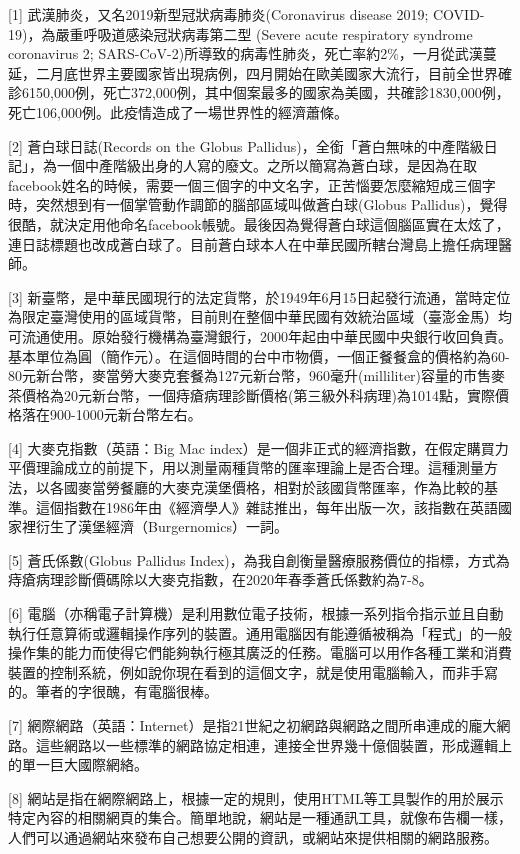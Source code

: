 \documentclass[
]{article}
\begin{document}
{[}1{]} 武漢肺炎，又名2019新型冠狀病毒肺炎(Coronavirus disease 2019;
COVID-19)，為嚴重呼吸道感染冠狀病毒第二型 (Severe acute respiratory
syndrome coronavirus 2;
SARS-CoV-2)所導致的病毒性肺炎，死亡率約2\%，一月從武漢蔓延，二月底世界主要國家皆出現病例，四月開始在歐美國家大流行，目前全世界確診6150,000例，死亡372,000例，其中個案最多的國家為美國，共確診1830,000例，死亡106,000例。此疫情造成了一場世界性的經濟蕭條。

{[}2{]} 蒼白球日誌(Records on the Globus
Pallidus)，全銜「蒼白無味的中產階級日記」，為一個中產階級出身的人寫的廢文。之所以簡寫為蒼白球，是因為在取facebook姓名的時候，需要一個三個字的中文名字，正苦惱要怎麼縮短成三個字時，突然想到有一個掌管動作調節的腦部區域叫做蒼白球(Globus
Pallidus)，覺得很酷，就決定用他命名facebook帳號。最後因為覺得蒼白球這個腦區實在太炫了，連日誌標題也改成蒼白球了。目前蒼白球本人在中華民國所轄台灣島上擔任病理醫師。

{[}3{]}
新臺幣，是中華民國現行的法定貨幣，於1949年6月15日起發行流通，當時定位為限定臺灣使用的區域貨幣，目前則在整個中華民國有效統治區域（臺澎金馬）均可流通使用。原始發行機構為臺灣銀行，2000年起由中華民國中央銀行收回負責。基本單位為圓（簡作元）。在這個時間的台中市物價，一個正餐餐盒的價格約為60-80元新台幣，麥當勞大麥克套餐為127元新台幣，960毫升(milliliter)容量的市售麥茶價格為20元新台幣，一個痔瘡病理診斷價格(第三級外科病理)為1014點，實際價格落在900-1000元新台幣左右。

{[}4{]} 大麥克指數（英語：Big Mac
index）是一個非正式的經濟指數，在假定購買力平價理論成立的前提下，用以測量兩種貨幣的匯率理論上是否合理。這種測量方法，以各國麥當勞餐廳的大麥克漢堡價格，相對於該國貨幣匯率，作為比較的基準。這個指數在1986年由《經濟學人》雜誌推出，每年出版一次，該指數在英語國家裡衍生了漢堡經濟（Burgernomics）一詞。

{[}5{]} 蒼氏係數(Globus Pallidus
Index)，為我自創衡量醫療服務價位的指標，方式為痔瘡病理診斷價碼除以大麥克指數，在2020年春季蒼氏係數約為7-8。

{[}6{]}
電腦（亦稱電子計算機）是利用數位電子技術，根據一系列指令指示並且自動執行任意算術或邏輯操作序列的裝置。通用電腦因有能遵循被稱為「程式」的一般操作集的能力而使得它們能夠執行極其廣泛的任務。電腦可以用作各種工業和消費裝置的控制系統，例如說你現在看到的這個文字，就是使用電腦輸入，而非手寫的。筆者的字很醜，有電腦很棒。

{[}7{]}
網際網路（英語：Internet）是指21世紀之初網路與網路之間所串連成的龐大網路。這些網路以一些標準的網路協定相連，連接全世界幾十億個裝置，形成邏輯上的單一巨大國際網絡。

{[}8{]}
網站是指在網際網路上，根據一定的規則，使用HTML等工具製作的用於展示特定內容的相關網頁的集合。簡單地說，網站是一種通訊工具，就像布告欄一樣，人們可以通過網站來發布自己想要公開的資訊，或網站來提供相關的網路服務。
\end{document}
